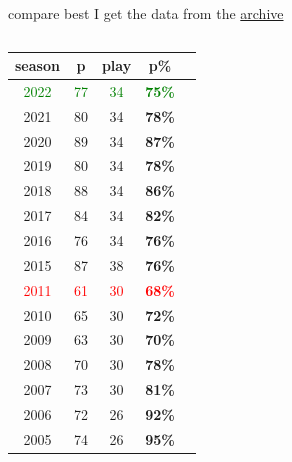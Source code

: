 \documentclass[8pt]{beamer}
\begin{document}
        \begin{frame}[t]{compare best}
            I get the data from the \href{https://ar.women.soccerway.com/national/egypt/premier-league/c206/archive/}{archive}\\
            \begin{columns}
                \begin{column}[t]{.3\textwidth}
                    \centering
                    \tiny\begin{tabular}{|c|c|c|c|}
                        \hline
                        season & p & play & \textbf{p}\%\\
                        \hline
                        \textcolor{green}{2022} & \textcolor{green}{77} & \textcolor{green}{34} & \textbf{\textcolor{green}{75\%}} &\\
                        2021 & 80 & 34 & \textbf{78\%} &\\
                        2020 & 89 & 34 & \textbf{87\%} &\\
                        2019 & 80 & 34 & \textbf{78\%} &\\
                        2018 & 88 & 34 & \textbf{86\%} &\\
                        2017 & 84 & 34 & \textbf{82\%} &\\
                        2016 & 76 & 34 & \textbf{76\%} &\\
                        2015 & 87 & 38 & \textbf{76\%} &\\
                        \textcolor{red}{2011} & \textcolor{red}{61} & \textcolor{red}{30} & \textbf{\textcolor{red}{68\%}} &\\
                        2010 & 65 & 30 & \textbf{72\%} &\\
                        2009 & 63 & 30 & \textbf{70\%} &\\
                        2008 & 70 & 30 & \textbf{78\%} &\\
                        2007 & 73 & 30 & \textbf{81\%} &\\
                        2006 & 72 & 26 & \textbf{92\%} &\\
                        2005 & 74 & 26 & \textbf{95\%} &
                        \hline
                    \end{tabular}
                    \pause
                \end{column}
                \begin{column}{.7\textwidth}
                    \begin{center}

\end{center}
\end{column}
\end{columns}
\end{frame}
\end{document}
